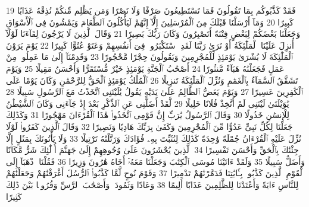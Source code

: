 {\tiny\colorbox{cl_aya}{19}} فَقَدْ كَذَّبُوكُم بِمَا تَقُولُونَ فَمَا تَسْتَطِيعُونَ صَرْفًا وَلَا نَصْرًا وَمَن يَظْلِم مِّنكُمْ نُذِقْهُ عَذَابًا كَبِيرًا
{\tiny\colorbox{cl_aya}{20}} وَمَآ أَرْسَلْنَا قَبْلَكَ مِنَ ٱلْمُرْسَلِينَ إِلَّآ إِنَّهُمْ لَيَأْكُلُونَ ٱلطَّعَامَ وَيَمْشُونَ فِى ٱلْأَسْوَاقِ وَجَعَلْنَا بَعْضَكُمْ لِبَعْضٍ فِتْنَةً أَتَصْبِرُونَ وَكَانَ رَبُّكَ بَصِيرًا
{\tiny\colorbox{cl_aya}{21}} وَقَالَ ٱلَّذِينَ لَا يَرْجُونَ لِقَآءَنَا لَوْلَآ أُنزِلَ عَلَيْنَا ٱلْمَلَٰٓئِكَةُ أَوْ نَرَىٰ رَبَّنَا لَقَدِ ٱسْتَكْبَرُوا۟ فِىٓ أَنفُسِهِمْ وَعَتَوْ عُتُوًّا كَبِيرًا
{\tiny\colorbox{cl_aya}{22}} يَوْمَ يَرَوْنَ ٱلْمَلَٰٓئِكَةَ لَا بُشْرَىٰ يَوْمَئِذٍ لِّلْمُجْرِمِينَ وَيَقُولُونَ حِجْرًا مَّحْجُورًا
{\tiny\colorbox{cl_aya}{23}} وَقَدِمْنَآ إِلَىٰ مَا عَمِلُوا۟ مِنْ عَمَلٍ فَجَعَلْنَٰهُ هَبَآءً مَّنثُورًا
{\tiny\colorbox{cl_aya}{24}} أَصْحَٰبُ ٱلْجَنَّةِ يَوْمَئِذٍ خَيْرٌ مُّسْتَقَرًّا وَأَحْسَنُ مَقِيلًا
{\tiny\colorbox{cl_aya}{25}} وَيَوْمَ تَشَقَّقُ ٱلسَّمَآءُ بِٱلْغَمَٰمِ وَنُزِّلَ ٱلْمَلَٰٓئِكَةُ تَنزِيلًا
{\tiny\colorbox{cl_aya}{26}} ٱلْمُلْكُ يَوْمَئِذٍ ٱلْحَقُّ لِلرَّحْمَٰنِ وَكَانَ يَوْمًا عَلَى ٱلْكَٰفِرِينَ عَسِيرًا
{\tiny\colorbox{cl_aya}{27}} وَيَوْمَ يَعَضُّ ٱلظَّالِمُ عَلَىٰ يَدَيْهِ يَقُولُ يَٰلَيْتَنِى ٱتَّخَذْتُ مَعَ ٱلرَّسُولِ سَبِيلًا
{\tiny\colorbox{cl_aya}{28}} يَٰوَيْلَتَىٰ لَيْتَنِى لَمْ أَتَّخِذْ فُلَانًا خَلِيلًا
{\tiny\colorbox{cl_aya}{29}} لَّقَدْ أَضَلَّنِى عَنِ ٱلذِّكْرِ بَعْدَ إِذْ جَآءَنِى وَكَانَ ٱلشَّيْطَٰنُ لِلْإِنسَٰنِ خَذُولًا
{\tiny\colorbox{cl_aya}{30}} وَقَالَ ٱلرَّسُولُ يَٰرَبِّ إِنَّ قَوْمِى ٱتَّخَذُوا۟ هَٰذَا ٱلْقُرْءَانَ مَهْجُورًا
{\tiny\colorbox{cl_aya}{31}} وَكَذَٰلِكَ جَعَلْنَا لِكُلِّ نَبِىٍّ عَدُوًّا مِّنَ ٱلْمُجْرِمِينَ وَكَفَىٰ بِرَبِّكَ هَادِيًا وَنَصِيرًا
{\tiny\colorbox{cl_aya}{32}} وَقَالَ ٱلَّذِينَ كَفَرُوا۟ لَوْلَا نُزِّلَ عَلَيْهِ ٱلْقُرْءَانُ جُمْلَةً وَٰحِدَةً كَذَٰلِكَ لِنُثَبِّتَ بِهِۦ فُؤَادَكَ وَرَتَّلْنَٰهُ تَرْتِيلًا
{\tiny\colorbox{cl_aya}{33}} وَلَا يَأْتُونَكَ بِمَثَلٍ إِلَّا جِئْنَٰكَ بِٱلْحَقِّ وَأَحْسَنَ تَفْسِيرًا
{\tiny\colorbox{cl_aya}{34}} ٱلَّذِينَ يُحْشَرُونَ عَلَىٰ وُجُوهِهِمْ إِلَىٰ جَهَنَّمَ أُو۟لَٰٓئِكَ شَرٌّ مَّكَانًا وَأَضَلُّ سَبِيلًا
{\tiny\colorbox{cl_aya}{35}} وَلَقَدْ ءَاتَيْنَا مُوسَى ٱلْكِتَٰبَ وَجَعَلْنَا مَعَهُۥٓ أَخَاهُ هَٰرُونَ وَزِيرًا
{\tiny\colorbox{cl_aya}{36}} فَقُلْنَا ٱذْهَبَآ إِلَى ٱلْقَوْمِ ٱلَّذِينَ كَذَّبُوا۟ بِـَٔايَٰتِنَا فَدَمَّرْنَٰهُمْ تَدْمِيرًا
{\tiny\colorbox{cl_aya}{37}} وَقَوْمَ نُوحٍ لَّمَّا كَذَّبُوا۟ ٱلرُّسُلَ أَغْرَقْنَٰهُمْ وَجَعَلْنَٰهُمْ لِلنَّاسِ ءَايَةً وَأَعْتَدْنَا لِلظَّٰلِمِينَ عَذَابًا أَلِيمًا
{\tiny\colorbox{cl_aya}{38}} وَعَادًا وَثَمُودَا۟ وَأَصْحَٰبَ ٱلرَّسِّ وَقُرُونًۢا بَيْنَ ذَٰلِكَ كَثِيرًا
